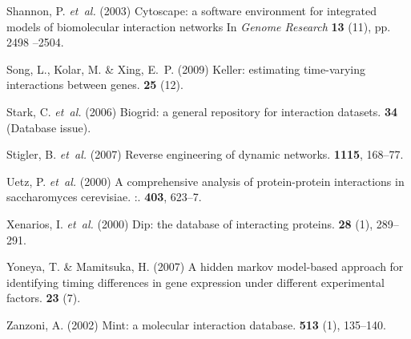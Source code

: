 \documentclass{bioinfo}
\begin{document}
\begin{thebibliography}{}
Shannon, P. {\em et~al.} (2003{\em{}}) Cytoscape: a software
environment for integrated models of biomolecular interaction networks 
\newblock In {\em Genome Research}  {\bf 13} (11), pp. 2498 --2504.

Song, L., Kolar, M.  \& Xing, E.~P. (2009{\em{}}) Keller: estimating
  time-varying interactions between genes.
 {\bf 25} (12).

Stark, C. {\em et~al.} (2006{\em{}}) Biogrid: a general repository for interaction
  datasets.
 {\bf 34} (Database issue).

Stigler, B. {\em et~al.} (2007{\em{}})
  Reverse engineering of dynamic networks.
 {\bf 1115}, 168--77.

Uetz, P. {\em et~al.} (2000{\em{}}) A
  comprehensive analysis of protein-protein interactions in saccharomyces
  cerevisiae. :.
 {\bf 403}, 623--7.

Xenarios, I. {\em et~al.} (2000{\em{}}) Dip: the database of interacting proteins.
 {\bf 28} (1), 289--291.

Yoneya, T. \& Mamitsuka, H. (2007{\em{}}) A hidden markov model-based approach
  for identifying timing differences in gene expression under different
  experimental factors.
 {\bf 23} (7).

Zanzoni, A. (2002{\em{}}) Mint: a molecular interaction database.
 {\bf 513} (1), 135--140.
\end{thebibliography}
\end{document}
